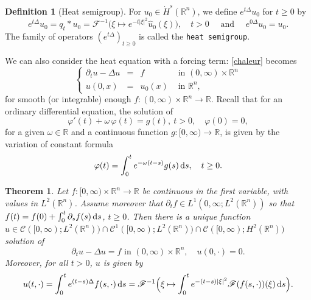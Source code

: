 \documentclass[a4paper, 12pt]{article}
\theoremstyle{plain}
\newtheorem{theorem}[proposition]{Theorem}
\theoremstyle{definition}
\newtheorem{definition}[proposition]{Definition}
\theoremstyle{remark}
\numberwithin{equation}{section}
\begin{document}
\begin{definition}[Heat semigroup]
For $u_0\in \dot H^s({\mathds{R}}^n)$, we define $e^{t\Delta}u_0$ for $t\ge 0$ by 
\[
e^{t\Delta}u_0=q_t * u_0 ={\mathscr{F}}^{-1}\bigl(\xi\mapsto e^{-t|\xi|^2}\hat{u}_0(\xi)\bigr), \quad t>0\quad \mbox{ and }\quad e^{0\Delta}u_0=u_0.
\]
The family of operators $(e^{t\Delta})_{t\ge0}$ is called the {\tt heat semigroup}.
\end{definition}

\noindent
We can also consider the heat equation with a forcing term: \eqref{chaleur} becomes
%
\begin{equation}
\label{eq:chaleur}
\left\{
\begin{array}{rcll}
\partial_t u - \Delta u &=& f & \mbox{ in } (0,\infty) \times {\mathds{R}}^n\\
u(0,x) & = & u_0(x) &  \mbox{ in } {\mathds{R}}^n,
\end{array}
\right.
\end{equation}
%
for smooth (or integrable) enough $f : (0,\infty)\times {\mathds{R}}^n\to {\mathds{R}}$. Recall that for an ordinary 
differential equation, the solution of 
\[
\varphi'(t)+\omega \,\varphi(t) = g(t), \ t>0, \quad \varphi(0)=0,
\]
for a given $\omega\in{\mathds{R}}$ and a continuous function $g:[0,\infty)\to {\mathds{R}}$, is given by the variation of constant formula
\[
\varphi(t)=\int_0^t e^{-\omega(t-s)}g(s)\,{\rm d}s, \quad t\ge 0.
\]

\begin{theorem}
\label{thm:classicalsol}
Let $f:[0,\infty)\times{\mathds{R}}^n\to {\mathds{R}}$ be continuous in the first variable, with values in $L^2({\mathds{R}}^n)$. Assume
moreover that $\partial_tf\in L^1(0,\infty;L^2({\mathds{R}}^n))$ so that $f(t)=f(0)+\int_0^t \partial_sf(s)\,{\rm d}s$, $t\ge 0$.
Then there is a unique function $u\in {\mathscr{C}}([0,\infty);L^2({\mathds{R}}^n))\cap {\mathscr{C}}^1([0,\infty);L^2({\mathds{R}}^n))
\cap {\mathscr{C}}([0,\infty);H^2({\mathds{R}}^n))$ solution of 
\[
\partial_tu-\Delta u =f \mbox{ in }(0,\infty)\times{\mathds{R}}^n, \quad u(0,\cdot)=0.
\]
Moreover, for all $t>0$, $u$ is given by
%
\begin{equation}
\label{eq:solchaleur}
u(t,\cdot)=\int_0^te^{(t-s)\Delta}f(s,\cdot)\,{\rm d}s
={\mathscr{F}}^{-1}\Bigl(\xi\mapsto \int_0^te^{-(t-s)|\xi|^2}{\mathscr{F}}(f(s,\cdot))(\xi)\,{\rm d}s\Bigr).
\end{equation}
\end{theorem}
\end{document}
